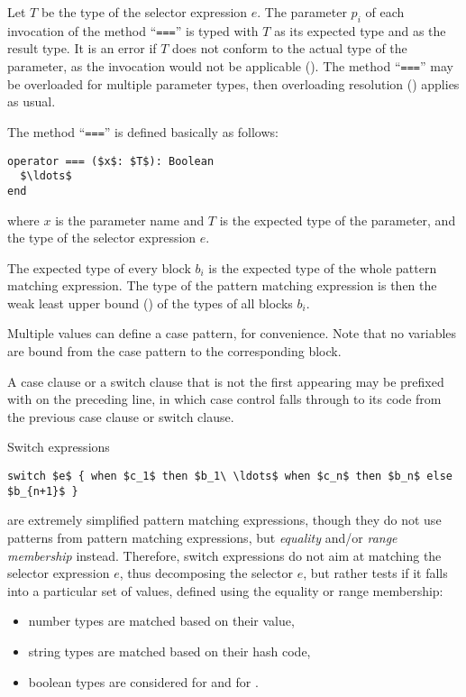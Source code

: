 Let $T$ be the type of the selector expression $e$. The parameter $p_i$ of each invocation of the method ``\lstinline!===!'' is typed with $T$ as its expected type and  as the result type. It is an error if $T$ does not conform to the actual type of the parameter, as the invocation would not be applicable (). The method ``\lstinline!===!'' may be overloaded for multiple parameter types, then overloading resolution () applies as usual. 

The method ``\lstinline!===!'' is defined basically as follows:
\begin{lstlisting}
operator === ($x$: $T$): Boolean
  $\ldots$
end
\end{lstlisting}
where $x$ is the parameter name and $T$ is the expected type of the parameter, and the type of the selector expression $e$. 

The expected type of every block $b_i$ is the expected type of the whole pattern matching expression. The type of the pattern matching expression is then the weak least upper bound () of the types of all blocks $b_i$.

Multiple values can define a case pattern, for convenience. Note that no variables are bound from the case pattern to the corresponding block.

A case clause or a switch clause that is not the first appearing may be prefixed with  on the preceding line, in which case control falls through to its code from the previous case clause or switch clause. 

Switch expressions 
\begin{lstlisting}
switch $e$ { when $c_1$ then $b_1\ \ldots$ when $c_n$ then $b_n$ else $b_{n+1}$ }
\end{lstlisting}
are extremely simplified pattern matching expressions, though they do not use patterns from pattern matching expressions, but {\em equality} and/or {\em range membership} instead. Therefore, switch expressions do not aim at matching the selector expression $e$, thus decomposing the selector $e$, but rather tests if it falls into a particular set of values, defined using the equality or range membership:
\begin{itemize}
  \item number types are matched based on their value,
  \item string types are matched based on their hash code,
  \item boolean types are considered  for  and  for .
\end{itemize}

